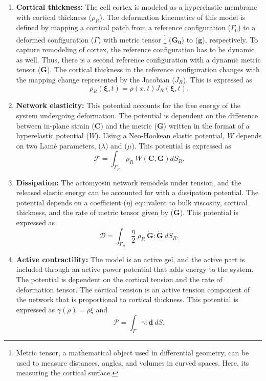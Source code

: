 \begin{enumerate}
	\item \textbf{Cortical thickness:} The cell cortex is modeled as a hyperelastic membrane with cortical thickness ($\rho_R$). The deformation kinematics of this model is defined by mapping a cortical patch from a reference configuration ($\Gamma_0$) to a deformed configuration ($\Gamma$) with metric tensor \footnote{Metric  tensor, a mathematical object used in differential geometry, can be used to measure distances, angles, and volumes in curved spaces. Here, its measuring the cortical surface.} ($\mathbf{G_0}$) to ($\mathbf{g}$), respectively. To capture remodeling of cortex, the reference configuration has to be dynamic as well. Thus, there is a second reference configuration with a dynamic metric tensor ($\mathbf{G}$). The cortical thickness in the reference configuration changes with the mapping change represented by the Jacobian ($J_R$). This is expressed as 
	$$\rho_R(\mathbf{\xi}, t) = \rho(x,t)J_R(\mathbf{\xi},t).$$
	\item \textbf{Network elasticity:} This potential accounts for the free energy of the system undergoing deformation. The potential is dependent on the difference between in-plane strain ($\mathbf{C}$) and the metric ($\mathbf{G}$) written in the format of a hyperelastic potential ($W$). Using a Neo-Hookean elastic potential, $W$ depends on two Lamé parameters, ($\lambda$) and ($\mu$). This potential is expressed as $$\mathcal{F} = \int_{\Gamma_R} \rho_R \ W(\mathbf{C,G})dS_R.$$
	\item \textbf{Dissipation:} The actomyosin network remodels under tension, and the released elastic energy can be accounted for with a dissipation potential. The potential depends on a coefficient ($\eta$) equivalent to bulk viscosity, cortical thickness, and the rate of metric tensor given by ($\dot{\mathbf{G}}$). This potential is expressed as $$\mathcal{D} = \int_{\Gamma_R} \frac{\eta}{2}\ \rho_R \ \mathbf{\dot{G}}:\mathbf{\dot{G}} \ dS_R.$$
	\item \textbf{Active contractility:} The model is an active gel, and the active part is included through an active power potential that adds energy to the system. The potential is dependent on the cortical tension and the rate of deformation tensor. The cortical tension is an active tension component of the network that is proportional to cortical thickness. This potential is expressed as $\gamma(\rho) = \rho \xi$ and $$\mathcal{P} = \int_{\Gamma} \gamma : \mathbf{d} \ dS.$$
	
\end{enumerate}

